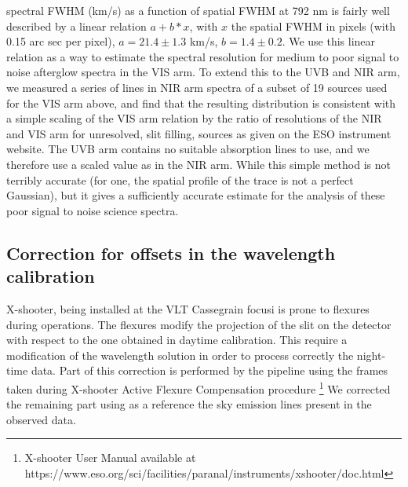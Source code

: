 \documentclass[iop, twocolappendix, numberedappendix, tighten, appendixfloats]{emulateapj}
\begin{document}
	spectral FWHM (km/s) as a function of spatial FWHM at 792 nm is fairly well described by a linear relation $a + b*x$, with $x$ the spatial FWHM in pixels (with
	0.15 arc sec per pixel),  $a= 21.4 \pm 1.3$ km/s, $b=1.4 \pm 0.2$. We use this linear relation as a 
	way to estimate the spectral resolution for medium to poor signal to noise afterglow spectra in the VIS arm. To extend this to the UVB and NIR arm, we measured
	a series of lines in NIR arm spectra of a subset of 19 sources used for the VIS arm above, and find that the resulting distribution is consistent with 
	a simple scaling of the VIS arm relation by the ratio of resolutions of the NIR and VIS arm for unresolved, slit filling, sources as given on the ESO instrument website.
	The UVB arm contains no suitable absorption lines to use, and we therefore use a scaled value as in the NIR arm.
	While this simple method is not terribly accurate (for one, the spatial profile of the trace is not a perfect Gaussian), but it gives a sufficiently accurate estimate for the analysis of these poor signal to noise science spectra. 
	
	
	
	\subsection{Correction for offsets in the wavelength calibration}    
	
	X-shooter, being installed at the VLT Cassegrain focusi is  prone to
	flexures during operations. The flexures modify the projection of the slit
	on the detector with respect to the one obtained in daytime calibration. 
	This require a modification of the wavelength solution in order to
	process correctly the night-time data. Part of this correction
	is performed by the pipeline using the frames taken
	during X-shooter Active Flexure Compensation procedure
	\footnote{X-shooter User Manual available at https://www.eso.org/sci/facilities/paranal/instruments/xshooter/doc.html}
	We corrected the remaining part using as a reference the sky
	emission lines present in the observed data.
	
\end{document}
